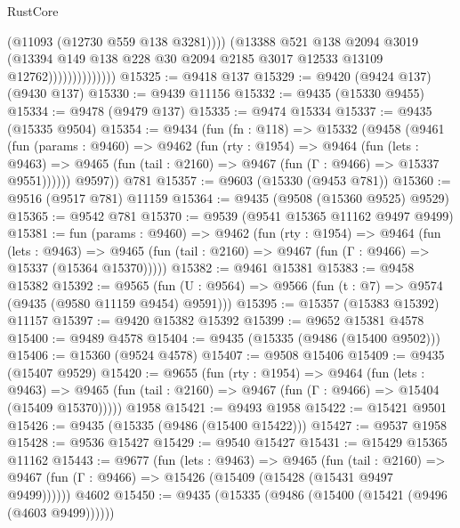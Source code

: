 \begin{lexlean}{RustCore}
\begin{coremodule}
                                (@11093 (@12730 @559 @138 @3281))))
                            (@13388
                              @521
                              @138
                              @2094
                              @3019
                              (@13394
                                @149
                                @138
                                @228
                                @30
                                @2094
                                @2185
                                @3017
                                @12533
                                @13109
                                @12762))))))))))))))
@15325 := @9418 @137
@15329 := @9420 (@9424 @137) (@9430 @137)
@15330 := @9439 @11156
@15332 := @9435 (@15330 @9455)
@15334 := @9478 (@9479 @137)
@15335 := @9474 @15334
@15337 := @9435 (@15335 @9504)
@15354 := @9434
    (fun (fn : @118) =>
    @15332
      (@9458
        (@9461
          (fun (params : @9460) =>
          @9462
            (fun (rty : @1954) =>
            @9464
              (fun (lets : @9463) =>
              @9465 (fun (tail : @2160) => @9467 (fun (Γ : @9466) => @15337 @9551))))))
        @9597))
    @781
@15357 := @9603 (@15330 (@9453 @781))
@15360 := @9516 (@9517 @781) @11159
@15364 := @9435 (@9508 (@15360 @9525) @9529)
@15365 := @9542 @781
@15370 := @9539 (@9541 @15365 @11162 @9497 @9499)
@15381 := fun (params : @9460) =>
  @9462
    (fun (rty : @1954) =>
    @9464
      (fun (lets : @9463) =>
      @9465 (fun (tail : @2160) => @9467 (fun (Γ : @9466) => @15337 (@15364 @15370)))))
@15382 := @9461 @15381
@15383 := @9458 @15382
@15392 := @9565
    (fun (U : @9564) => @9566 (fun (t : @7) => @9574 (@9435 (@9580 @11159 @9454) @9591)))
@15395 := @15357 (@15383 @15392) @11157
@15397 := @9420 @15382 @15392
@15399 := @9652 @15381 @4578
@15400 := @9489 @4578
@15404 := @9435 (@15335 (@9486 (@15400 @9502)))
@15406 := @15360 (@9524 @4578)
@15407 := @9508 @15406
@15409 := @9435 (@15407 @9529)
@15420 := @9655
    (fun (rty : @1954) =>
    @9464
      (fun (lets : @9463) =>
      @9465 (fun (tail : @2160) => @9467 (fun (Γ : @9466) => @15404 (@15409 @15370)))))
    @1958
@15421 := @9493 @1958
@15422 := @15421 @9501
@15426 := @9435 (@15335 (@9486 (@15400 @15422)))
@15427 := @9537 @1958
@15428 := @9536 @15427
@15429 := @9540 @15427
@15431 := @15429 @15365 @11162
@15443 := @9677
    (fun (lets : @9463) =>
    @9465
      (fun (tail : @2160) =>
      @9467 (fun (Γ : @9466) => @15426 (@15409 (@15428 (@15431 @9497 @9499))))))
    @4602
@15450 := @9435 (@15335 (@9486 (@15400 (@15421 (@9496 (@4603 @9499))))))

\end{coremodule}
\end{lexlean}
